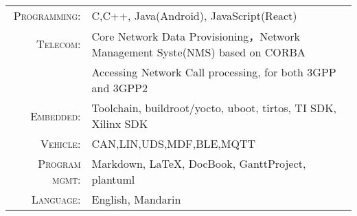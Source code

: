 %
%


 
\renewcommand{\arraystretch}{1.1}

	\begin{tabular}{>{}r>{}p{13cm}} 
		\textsc{Programming:}      & C,C++, Java(Android), JavaScript(React)\\  
		\textsc{Telecom:} 		   & Core Network Data Provisioning，Network Management Syste(NMS) based on CORBA\\
							   & Accessing Network Call processing, for both 3GPP and 3GPP2 \\
		\textsc{Embedded:}	   & Toolchain, buildroot/yocto, uboot, tirtos, TI SDK, Xilinx SDK  \\
		\textsc{Vehicle:}	   & CAN,LIN,UDS,MDF,BLE,MQTT \\
		\textsc{Program mgmt:}	   & Markdown, LaTeX, DocBook, GanttProject, plantuml \\
		\textsc{Language:}	    &  English, Mandarin  \\
	\end{tabular}
	
